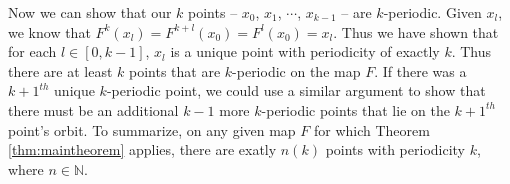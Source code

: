 \documentclass[12pt]{IEEEtran}
\begin{document}
Now we can show that our $k$ points -- $x_0$, $x_1$, $\cdots$, $x_{k-1}$ -- are $k$-periodic. Given $x_l$, we know that $F^k \left( x_l \right) = F^{k+l} \left ( x_0 \right) = F^{l} \left ( x_0 \right) = x_l$. Thus we have shown that for each $l \in [0,k-1]$, $x_l$ is a unique point with periodicity of exactly $k$. Thus there are at least $k$ points that are $k$-periodic on the map $F$. If there was a $k+1^{th}$ unique $k$-periodic point, we could use a similar argument to show that there must be an additional $k-1$ more $k$-periodic points that lie on the $k+1^{th}$ point's orbit. To summarize, on any given map $F$ for which Theorem \ref{thm:maintheorem} applies, there are exatly $n \left( k \right)$ points with periodicity $k$, where $n \in \mathbb{N}$.

\end{document}
